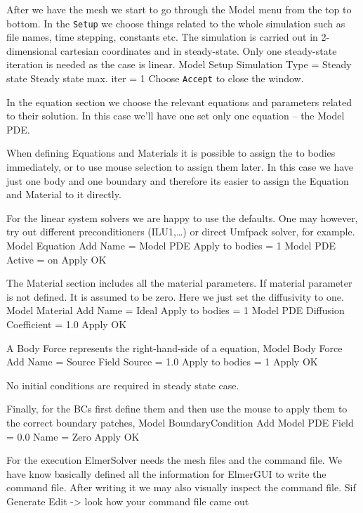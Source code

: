 After we have the mesh we start to go through the Model menu from the top to bottom. 
In the \texttt{Setup} we choose things related to the whole simulation such as file names, 
time stepping, constants etc.
The simulation is carried out in 2-dimensional cartesian
coordinates and in steady-state. 
Only one steady-state iteration is needed as the case is linear. 
\ttbegin
Model
  Setup 
    Simulation Type = Steady state
    Steady state max. iter = 1
\ttend
Choose \texttt{Accept} to close the window.

In the equation section we choose the relevant equations and parameters related to their solution. 
In this case we'll have one set only one equation -- the Model PDE.


When defining Equations and Materials it is possible to assign the to bodies immediately, or to use mouse
selection to assign them later. In this case we have just one body and one boundary and therefore its easier to assign 
the Equation and Material to it directly.

For the linear system solvers we are happy to use the defaults. One may however, try out different
preconditioners (ILU1,\ldots) or direct Umfpack solver, for example.
\ttbegin
Model
  Equation
    Add 
      Name = Model PDE
      Apply to bodies = 1
      Model PDE
        Active = on
  Apply   
  OK
\ttend        

The Material section includes all the material parameters.
If material parameter is not defined. It is assumed to be zero. 
Here we just set the diffusivity to one.
\ttbegin
Model
  Material
    Add 
      Name = Ideal
      Apply to bodies = 1 
      Model PDE
        Diffusion Coefficient = 1.0
    Apply
    OK
\ttend

A Body Force represents the right-hand-side of a equation,  
\ttbegin
Model
  Body Force
    Add 
      Name = Source
      Field Source = 1.0
      Apply to bodies = 1
    Apply
    OK
\ttend    

No initial conditions are required in steady state case.

Finally, for the BCs first define them and then use the mouse to apply them to the correct
boundary patches,
\ttbegin
Model
  BoundaryCondition
    Add 
      Model PDE
        Field = 0.0
      Name = Zero
    Apply
    OK
\ttend   


For the execution 
ElmerSolver needs the mesh files and the command file. We have know basically defined
all the information for ElmerGUI to write the command file. After writing it we may also visually 
inspect the command file.
\ttbegin
Sif 
  Generate
  Edit -> look how your command file came out  
\ttend

